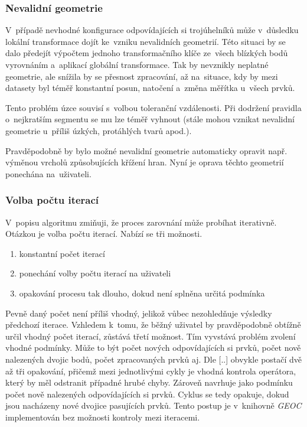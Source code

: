 \subsubsection{Nevalidní geometrie}

V~případě nevhodné konfigurace odpovídajících si trojúhelníků může v~důsledku
lokální transformace dojít ke~vzniku nevalidních geometrií. Této situaci by se
dalo předejít výpočtem jednoho transformačního klíče ze~všech blízkých bodů
vyrovnáním a~aplikací globální transformace. Tak by nevznikly neplatné geometrie,
ale snížila by se přesnost zpracování, až na~situace, kdy by mezi datasety byl
téměř konstantní posun, natočení a~změna měřítka u~všech prvků.


Tento problém úzce souvisí s~volbou toleranční vzdálenosti. Při dodržení pravidla
o~nejkratším segmentu  se mu lze téměř vyhnout (stále mohou vznikat nevalidní 
geometrie u~příliš úzkých, protáhlých tvarů apod.). 

Pravděpodobně by bylo možné nevalidní geometrie automaticky opravit např. výměnou
vrcholů způsobujících křížení hran. Nyní je oprava těchto geometrií ponechána 
na~uživateli.

\subsubsection{Volba počtu iterací}

V~popisu algoritmu zmiňuji, že proces zarovnání může probíhat iterativně.
Otázkou je volba počtu iterací. Nabízí se tři možnosti.
\begin{enumerate}
 \item konstantní počet iterací
 \item ponechání volby počtu iterací na uživateli
 \item opakování procesu tak dlouho, dokud není splněna určitá podmínka
\end{enumerate}
Pevně daný počet není příliš vhodný, jelikož vůbec nezohledňuje výsledky
předchozí iterace. Vzhledem k~tomu, že běžný uživatel by pravděpodobně
obtížně určil vhodný počet iterací, zůstává třetí možnost. Tím vyvstává
problém zvolení vhodné podmínky. Může to být počet nových odpovídajících 
si prvků, počet nově nalezených dvojic bodů, počet zpracovaných prvků aj.
Dle [..]  obvykle postačí dvě až tři opakování, %
přičemž mezi jednotlivými cykly je vhodná kontrola operátora,
který by měl odstranit případné hrubé chyby. Zároveň navrhuje jako podmínku
počet nově nalezených odpovídajících si prvků. Cyklus se tedy opakuje,
dokud jsou nacházeny nové dvojice pasujících prvků. Tento postup je   %
v~knihovně \textit{GEOC} implementován bez možnosti kontroly mezi iteracemi. 



